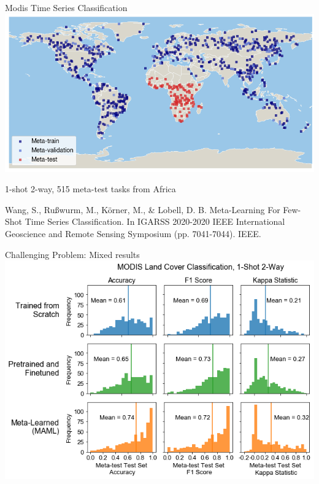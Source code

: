 \documentclass[11pt]{beamer}
\newcommand{\citeapa}[1]{ {\tiny#1\par} }
\begin{document}
	\begin{frame}{Modis Time Series Classification}
		\centering
				\includegraphics[width=.75\textwidth]{igarss2020/modis_task_map}
				
		\vfill
		
		1-shot 2-way, 515 meta-test tasks from Africa

		\citeapa{Wang, S., Rußwurm, M., Körner, M., \& Lobell, D. B. Meta-Learning For Few-Shot Time Series Classification. In IGARSS 2020-2020 IEEE International Geoscience and Remote Sensing Symposium (pp. 7041-7044). IEEE.}
	\end{frame}

	\begin{frame}{Challenging Problem: Mixed results}
		\includegraphics[width=\textwidth]{igarss2020/modis_africa_histograms_narrow}
	\end{frame}
\end{document}
